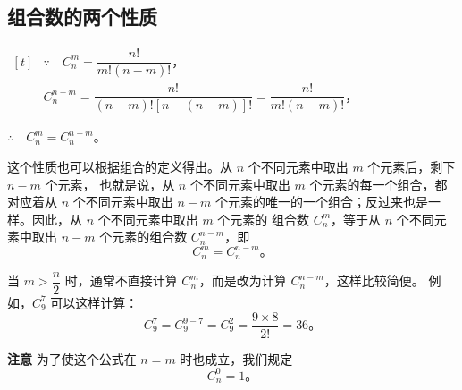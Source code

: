 \subsection{组合数的两个性质}\label{subsec:2-6}

\begin{theorem}\label{theorem:zhs-1}
\end{theorem}
\begin{center}
\end{center}

\zhengming $\begin{aligned}[t]
    &\because \quad C_n^m = \dfrac{n!}{m! (n-m)!} \text{，} \\
    &C_n^{n-m} = \dfrac{n!}{(n-m)! [n - (n-m)]!} = \dfrac{n!}{m! (n-m)!} \text{，}
\end{aligned}$

$\therefore \quad C_n^m = C_n^{n-m}$。

这个性质也可以根据组合的定义得出。从 $n$ 个不同元素中取出 $m$ 个元素后，剩下 $n-m$ 个元素，
也就是说，从 $n$ 个不同元素中取出 $m$ 个元素的每一个组合，都对应着从 $n$ 个不同元素中取出
$n-m$ 个元素的唯一的一个组合；反过来也是一样。因此，从 $n$ 个不同元素中取出 $m$ 个元素的
组合数 $C_n^m$，等于从 $n$ 个不同元素中取出 $n-m$ 个元素的组合数 $C_n^{n-m}$，即
$$ C_n^m = C_n^{n-m} \text{。} $$

当 $m > \dfrac{n}{2}$ 时，通常不直接计算 $C_n^m$，而是改为计算 $C_n^{n-m}$，这样比较简便。
例如，$C_9^7$ 可以这样计算：
$$ C_9^7 = C_9^{9-7} = C_9^2 = \dfrac{9 \times 8}{2!} = 36 \text{。} $$

\textbf{注意} \quad 为了使这个公式在 $n=m$ 时也成立，我们规定
$$ C_n^0 = 1 \text{。} $$


\begin{theorem}\label{theorem:zhs-2}
\end{theorem}
\begin{center}
\end{center}

